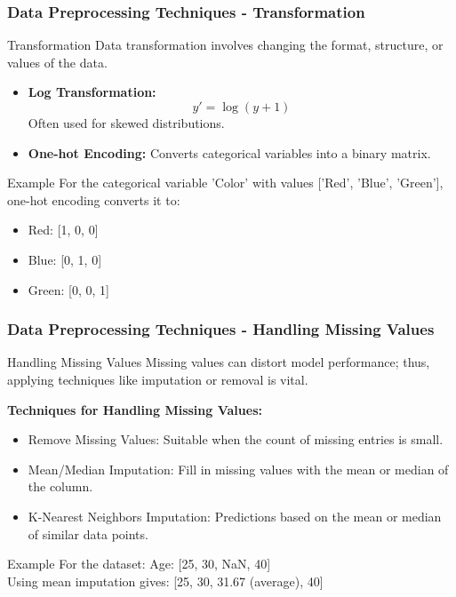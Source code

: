\documentclass[aspectratio=169]{beamer}
\begin{document}
\begin{frame}[fragile]
    \frametitle{Data Preprocessing Techniques - Transformation}
    \begin{block}{Transformation}
        Data transformation involves changing the format, structure, or values of the data.
    \end{block}
    \begin{itemize}
        \item \textbf{Log Transformation:}
        \begin{equation}
        y' = \log(y + 1)
        \end{equation}
        Often used for skewed distributions.
        
        \item \textbf{One-hot Encoding:} 
        Converts categorical variables into a binary matrix.
    \end{itemize}
    \begin{block}{Example}
        For the categorical variable 'Color' with values ['Red', 'Blue', 'Green'], one-hot encoding converts it to:
        \begin{itemize}
            \item Red: [1, 0, 0]
            \item Blue: [0, 1, 0]
            \item Green: [0, 0, 1]
        \end{itemize}
    \end{block}
\end{frame}

\begin{frame}[fragile]
    \frametitle{Data Preprocessing Techniques - Handling Missing Values}
    \begin{block}{Handling Missing Values}
        Missing values can distort model performance; thus, applying techniques like imputation or removal is vital.
    \end{block}
    \textbf{Techniques for Handling Missing Values:}
    \begin{itemize}
        \item Remove Missing Values: Suitable when the count of missing entries is small.
        \item Mean/Median Imputation: Fill in missing values with the mean or median of the column.
        \item K-Nearest Neighbors Imputation: Predictions based on the mean or median of similar data points.
    \end{itemize}
    \begin{block}{Example}
        For the dataset: Age: [25, 30, NaN, 40] 
        \\
        Using mean imputation gives: [25, 30, 31.67 (average), 40]
    \end{block}
\end{frame}
\end{document}
